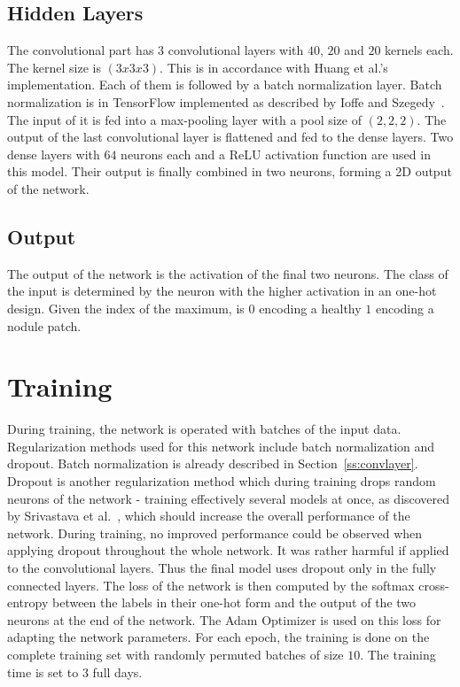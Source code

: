 \documentclass[main.tex]{subfiles}
\begin{document}
\subsection{Hidden Layers}
The convolutional part has $3$ convolutional layers with $40$, $20$ and $20$ kernels each. The kernel size is $(3x3x3)$. This is in accordance with Huang et al.'s~\cite{huang2017lung} implementation. Each of them is followed by a batch normalization layer. Batch normalization is in TensorFlow implemented as described by Ioffe and Szegedy~\cite{ioffe2015batch}. The input of it is fed into a max-pooling layer with a pool size of $(2,2,2)$. The output of the last convolutional layer is flattened and fed to the dense layers. Two dense layers with $64$ neurons each and a ReLU activation function are used in this model. Their output is finally combined in two neurons, forming a 2D output of the network. 


\subsection{Output}
The output of the network is the activation of the final two neurons. The class of the input is determined by the neuron with the higher activation in an one-hot design. Given the index of the maximum, is $0$ encoding a healthy $1$ encoding a nodule patch.


\section{Training}
During training, the network is operated with batches of the input data. Regularization methods used for this network include batch normalization and dropout. Batch normalization is already described in Section~\ref{ss:convlayer}. Dropout is another regularization method which during training drops random neurons of the network - training effectively several models at once, as discovered by Srivastava et al.~\cite{srivastava2014dropout}, which should increase the overall performance of the network. During training, no improved performance could be observed when applying dropout throughout the whole network. It was rather harmful if applied to the convolutional layers. Thus the final model uses dropout only in the fully connected layers. The loss of the network is then computed by the softmax cross-entropy between the labels in their one-hot form and the output of the two neurons at the end of the network. The Adam Optimizer is used on this loss for adapting the network parameters. For each epoch, the training is done on the complete training set with randomly permuted batches of size $10$. The training time is set to 3 full days.
                                                 
\end{document}
